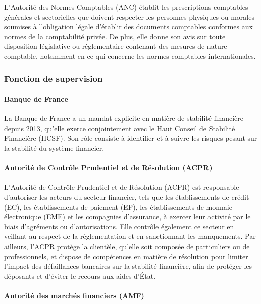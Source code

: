 \documentclass[a4paper, 12pt]{report}
\begin{document}
L'Autorité des Normes Comptables (ANC) établit les prescriptions comptables générales et sectorielles que doivent respecter les personnes physiques ou morales soumises à l'obligation légale d'établir des documents comptables conformes aux normes de la comptabilité privée. De plus, elle donne son avis sur toute disposition législative ou réglementaire contenant des mesures de nature comptable, notamment en ce qui concerne les normes comptables internationales.

\subsubsection{Fonction de supervision}

\paragraph{Banque de France}

La Banque de France a un mandat explicite en matière de stabilité financière depuis 2013, qu'elle exerce conjointement avec le Haut Conseil de Stabilité Financière (HCSF). Son rôle consiste à identifier et à suivre les risques pesant sur la stabilité du système financier.

\paragraph{Autorité de Contrôle Prudentiel et de Résolution (ACPR)}

L'Autorité de Contrôle Prudentiel et de Résolution (ACPR) est responsable d'autoriser les acteurs du secteur financier, tels que les établissements de crédit (EC), les établissements de paiement (EP), les établissements de monnaie électronique (EME) et les compagnies d'assurance, à exercer leur activité par le biais d'agréments ou d'autorisations. Elle contrôle également ce secteur en veillant au respect de la réglementation et en sanctionnant les manquements. Par ailleurs, l'ACPR protège la clientèle, qu'elle soit composée de particuliers ou de professionnels, et dispose de compétences en matière de résolution pour limiter l'impact des défaillances bancaires sur la stabilité financière, afin de protéger les déposants et d'éviter le recours aux aides d'État.

\paragraph{Autorité des marchés financiers (AMF)}
\end{document}
